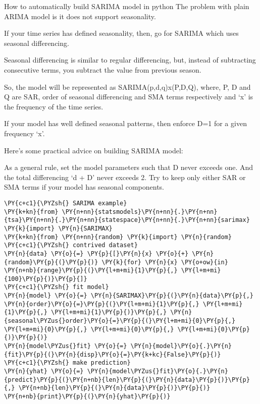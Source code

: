 How to automatically build SARIMA model in python The problem with plain
ARIMA model is it does not support seasonality.

If your time series has defined seasonality, then, go for SARIMA which
uses seasonal differencing.

Seasonal differencing is similar to regular differencing, but, instead
of subtracting consecutive terms, you subtract the value from previous
season.

So, the model will be represented as SARIMA(p,d,q)x(P,D,Q), where, P, D
and Q are SAR, order of seasonal differencing and SMA terms respectively
and `x' is the frequency of the time series.

If your model has well defined seasonal patterns, then enforce D=1 for a
given frequency `x'.

Here's some practical advice on building SARIMA model:

As a general rule, set the model parameters such that D never exceeds
one. And the total differencing `d + D' never exceeds 2. Try to keep
only either SAR or SMA terms if your model has seasonal components.

\begin{codebox}[breakable, size=fbox, boxrule=1pt, pad at break*=1mm,colback=cellbackground, colframe=cellborder]
\begin{Verbatim}[commandchars=\\\{\}]
\PY{c+c1}{\PYZsh{} SARIMA example}
\PY{k+kn}{from} \PY{n+nn}{statsmodels}\PY{n+nn}{.}\PY{n+nn}{tsa}\PY{n+nn}{.}\PY{n+nn}{statespace}\PY{n+nn}{.}\PY{n+nn}{sarimax} \PY{k}{import} \PY{n}{SARIMAX}
\PY{k+kn}{from} \PY{n+nn}{random} \PY{k}{import} \PY{n}{random}
\PY{c+c1}{\PYZsh{} contrived dataset}
\PY{n}{data} \PY{o}{=} \PY{p}{[}\PY{n}{x} \PY{o}{+} \PY{n}{random}\PY{p}{(}\PY{p}{)} \PY{k}{for} \PY{n}{x} \PY{o+ow}{in} \PY{n+nb}{range}\PY{p}{(}\PY{l+m+mi}{1}\PY{p}{,} \PY{l+m+mi}{100}\PY{p}{)}\PY{p}{]}
\PY{c+c1}{\PYZsh{} fit model}
\PY{n}{model} \PY{o}{=} \PY{n}{SARIMAX}\PY{p}{(}\PY{n}{data}\PY{p}{,} \PY{n}{order}\PY{o}{=}\PY{p}{(}\PY{l+m+mi}{1}\PY{p}{,} \PY{l+m+mi}{1}\PY{p}{,} \PY{l+m+mi}{1}\PY{p}{)}\PY{p}{,} \PY{n}{seasonal\PYZus{}order}\PY{o}{=}\PY{p}{(}\PY{l+m+mi}{0}\PY{p}{,} \PY{l+m+mi}{0}\PY{p}{,} \PY{l+m+mi}{0}\PY{p}{,} \PY{l+m+mi}{0}\PY{p}{)}\PY{p}{)}
\PY{n}{model\PYZus{}fit} \PY{o}{=} \PY{n}{model}\PY{o}{.}\PY{n}{fit}\PY{p}{(}\PY{n}{disp}\PY{o}{=}\PY{k+kc}{False}\PY{p}{)}
\PY{c+c1}{\PYZsh{} make prediction}
\PY{n}{yhat} \PY{o}{=} \PY{n}{model\PYZus{}fit}\PY{o}{.}\PY{n}{predict}\PY{p}{(}\PY{n+nb}{len}\PY{p}{(}\PY{n}{data}\PY{p}{)}\PY{p}{,} \PY{n+nb}{len}\PY{p}{(}\PY{n}{data}\PY{p}{)}\PY{p}{)}
\PY{n+nb}{print}\PY{p}{(}\PY{n}{yhat}\PY{p}{)}
\end{Verbatim}
\end{codebox}

